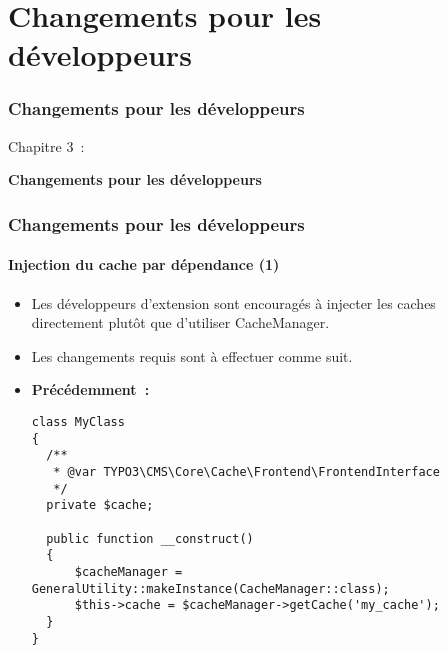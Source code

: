 %

\section{Changements pour les développeurs}
\begin{frame}[fragile]
	\frametitle{Changements pour les développeurs}

	\begin{center}\huge{Chapitre 3~:}\end{center}
	\begin{center}\huge{\color{typo3darkgrey}\textbf{Changements pour les développeurs}}\end{center}

\end{frame}


\begin{frame}[fragile]
	\frametitle{Changements pour les développeurs}
	\framesubtitle{Injection du cache par dépendance (1)}

	\lstset{basicstyle=\tiny\ttfamily}

	\begin{itemize}
		\item Les développeurs d'extension sont encouragés à injecter les caches directement plutôt
			que d'utiliser CacheManager.
		\item Les changements requis sont à effectuer comme suit.

		\item \textbf{Précédemment~:}

\begin{lstlisting}
class MyClass
{
  /**
   * @var TYPO3\CMS\Core\Cache\Frontend\FrontendInterface
   */
  private $cache;

  public function __construct()
  {
      $cacheManager = GeneralUtility::makeInstance(CacheManager::class);
      $this->cache = $cacheManager->getCache('my_cache');
  }
}
\end{lstlisting}

	\end{itemize}

\end{frame}

